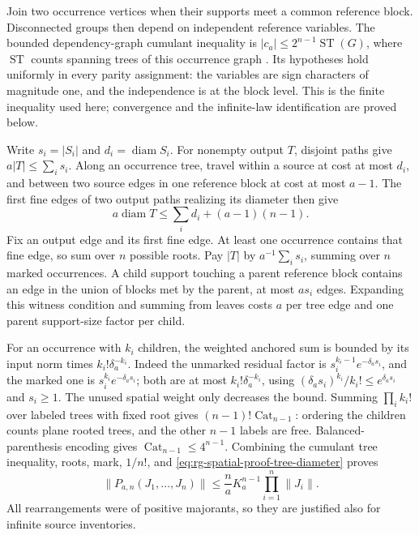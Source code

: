 Join two occurrence vertices when their supports meet a common reference
block. Disconnected groups then depend on independent reference variables.
The bounded dependency-graph cumulant inequality is
\(|c_a|\le2^{n-1}\operatorname{ST}(G)\), where \(\operatorname{ST}\)
counts spanning trees of this occurrence graph
\citep{feray2016modphi}. Its hypotheses hold uniformly in every parity
assignment: the variables are sign characters of magnitude one, and the
independence is at the block level. This is the finite inequality used
here; convergence and the infinite-law identification are proved below.

Write \(s_i=|S_i|\) and \(d_i=\operatorname{diam}S_i\). For nonempty
output \(T\), disjoint paths give \(a|T|\le\sum_i s_i\). Along an
occurrence tree, travel within a source at cost at most \(d_i\), and
between two source edges in one reference block at cost at most \(a-1\).
The first fine edges of two output paths realizing its diameter then give
\begin{equation}
 a\operatorname{diam}T\le\sum_i d_i+(a-1)(n-1).
 \label{eq:rg-spatial-proof-tree-diameter}
\end{equation}
Fix an output edge and its first fine edge. At least one occurrence contains
that fine edge, so sum over \(n\) possible roots. Pay \(|T|\) by
\(a^{-1}\sum_i s_i\), summing over \(n\) marked occurrences. A child
support touching a parent reference block contains an edge in the union of
blocks met by the parent, at most \(a s_i\) edges. Expanding this witness
condition and summing from leaves costs \(a\) per tree edge and one parent
support-size factor per child.

For an occurrence with \(k_i\) children, the weighted anchored sum is
bounded by its input norm times \(k_i!\delta_a^{-k_i}\). Indeed the
unmarked residual factor is
\(s_i^{k_i-1}e^{-\delta_as_i}\), and the marked one is
\(s_i^{k_i}e^{-\delta_as_i}\); both are at most
\(k_i!\delta_a^{-k_i}\), using
\((\delta_as_i)^{k_i}/k_i!\le e^{\delta_as_i}\) and \(s_i\ge1\).
The unused spatial weight only decreases the bound. Summing
\(\prod_i k_i!\) over labeled trees with fixed root gives
\((n-1)!\operatorname{Cat}_{n-1}\): ordering the children counts plane
rooted trees, and the other \(n-1\) labels are free. Balanced-parenthesis
encoding gives \(\operatorname{Cat}_{n-1}\le4^{n-1}\). Combining the
cumulant tree inequality, roots, mark, \(1/n!\), and
\cref{eq:rg-spatial-proof-tree-diameter} proves
\begin{equation}
 \|P_{a,n}(J_1,\ldots,J_n)\|
 \le\frac n a K_a^{n-1}\prod_{i=1}^n\|J_i\|.
 \label{eq:rg-spatial-proof-multilinear-majorant}
\end{equation}
All rearrangements were of positive majorants, so they are justified also
for infinite source inventories.

